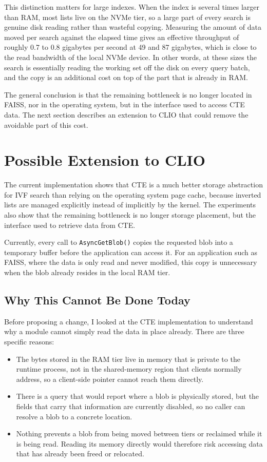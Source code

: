 \documentclass[11pt]{article}
\begin{document}
This distinction matters for large indexes. When the index is several
times larger than RAM, most lists live on the NVMe tier, so a large
part of every search is genuine disk reading rather than wasteful
copying. Measuring the amount of data moved per search against the
elapsed time gives an effective throughput of roughly 0.7 to 0.8
gigabytes per second at 49 and 87 gigabytes, which is close to the
read bandwidth of the local NVMe device. In other words, at these
sizes the search is essentially reading the working set off the disk
on every query batch, and the copy is an additional cost on top of the
part that is already in RAM.

The general conclusion is that the remaining bottleneck is no longer
located in FAISS, nor in the operating system, but in the interface
used to access CTE data. The next section describes an extension to
CLIO that could remove the avoidable part of this cost.

\section{Possible Extension to CLIO}

The current implementation shows that CTE is a much better storage
abstraction for IVF search than relying on the operating system page
cache, because inverted lists are managed explicitly instead of
implicitly by the kernel. The experiments also show that the remaining
bottleneck is no longer storage placement, but the interface used to
retrieve data from CTE.

Currently, every call to \texttt{AsyncGetBlob()} copies the requested
blob into a temporary buffer before the application can access it. For
an application such as FAISS, where the data is only read and never
modified, this copy is unnecessary when the blob already resides in
the local RAM tier.

\subsection{Why This Cannot Be Done Today}

Before proposing a change, I looked at the CTE implementation to
understand why a module cannot simply read the data in place already.
There are three specific reasons:

\begin{itemize}
\item The bytes stored in the RAM tier live in memory that is private
to the runtime process, not in the shared-memory region that clients
normally address, so a client-side pointer cannot reach them directly.
\item There is a query that would report where a blob is physically
stored, but the fields that carry that information are currently
disabled, so no caller can resolve a blob to a concrete location.
\item Nothing prevents a blob from being moved between tiers or
reclaimed while it is being read. Reading its memory directly would
therefore risk accessing data that has already been freed or relocated.
\end{itemize}
\end{document}
